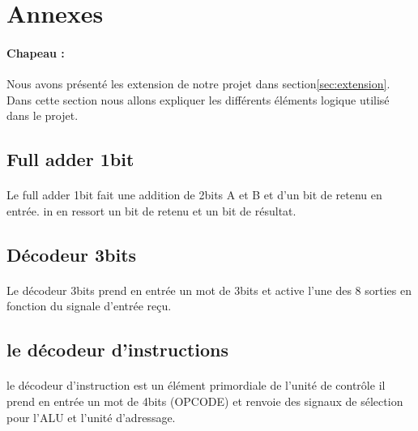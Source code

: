 \section{Annexes}
\label{sec:annexes}

\paragraph{Chapeau :} Nous avons présenté les extension de notre projet dans section\ref{sec:extension}. Dans cette section nous allons expliquer les différents éléments logique utilisé dans le projet.

\subsection{Full adder 1bit} 
\label{sec:full adder}

\paragraph{} Le full adder 1bit fait une addition de 2bits A et B et d'un bit de retenu en entrée. in en ressort un bit de retenu et un bit de résultat.


\subsection{Décodeur 3bits} 
\label{sec:dec3}

\paragraph{} Le décodeur 3bits prend en entrée un mot de 3bits et active l'une des 8 sorties en fonction du signale d'entrée reçu.


\subsection{le décodeur d'instructions} 
\label{sec:deci}

\paragraph{} le décodeur d'instruction est un élément primordiale de l'unité de contrôle il prend en entrée un mot de 4bits (OPCODE) et renvoie des signaux de sélection pour l'ALU et l'unité d'adressage.

